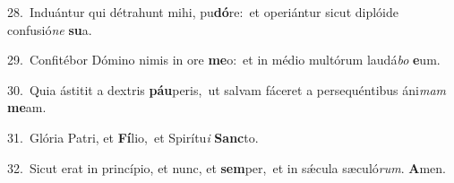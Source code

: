 {\numbfont\textcolor{\numbcolor}{28.}}~Induántur qui détrahunt mihi, pu\-\textbf{dó}\-re:~\star et operiántur sicut diplóide confusió\textit{ne} \textbf{su}\-a.\par
{\numbfont\textcolor{\numbcolor}{29.}}~Confitébor Dómino nimis in ore \textbf{me}\-o:~\star et in médio multórum laudá\textit{bo} \textbf{e}\-um.\par
{\numbfont\textcolor{\numbcolor}{30.}}~Quia ástitit a dextris \textbf{páu}\-peris,~\star ut salvam fáceret a persequéntibus áni\textit{mam} \textbf{me}\-am.\par
{\numbfont\textcolor{\numbcolor}{31.}}~Glória Patri, et \textbf{Fí}\-lio,~\star et Spirítu\textit{i} \textbf{Sanc}\-to.\par
{\numbfont\textcolor{\numbcolor}{32.}}~Sicut erat in princípio, et nunc, et \textbf{sem}\-per,~\star et in sǽcula sæculó\-\textit{rum}\-. \textbf{A}\-men.\par
